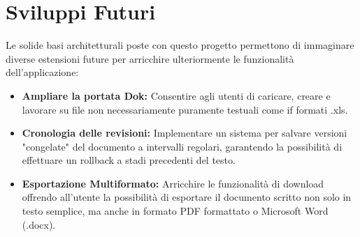 \documentclass[11pt,a4paper]{report}
\begin{document}
\section{Sviluppi Futuri}
Le solide basi architetturali poste con questo progetto permettono di immaginare diverse estensioni future per arricchire ulteriormente le funzionalità dell'applicazione:
\begin{itemize}
    \item \textbf{Ampliare la portata Dok:} Consentire agli utenti di caricare, creare e lavorare su file non necessariamente puramente testuali come if formati .xls.
    \item \textbf{Cronologia delle revisioni:} Implementare un sistema per salvare versioni "congelate" del documento a intervalli regolari, garantendo la possibilità di effettuare un rollback a stadi precedenti del testo.
    \item \textbf{Esportazione Multiformato:} Arricchire le funzionalità di download offrendo all'utente la possibilità di esportare il documento scritto non solo in testo semplice, ma anche in formato PDF formattato o Microsoft Word (.docx).
\end{itemize}
\end{document}
